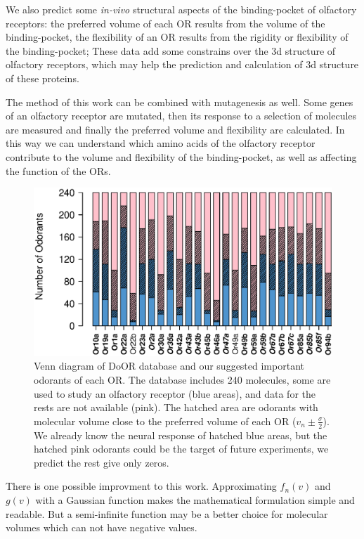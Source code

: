 \documentclass[11pt]{paper} %
\begin{document}
We also predict some {\it in-vivo} structural aspects of  the binding-pocket of olfactory receptors:
the preferred volume of each OR results from the volume of the binding-pocket,
the flexibility of an OR results from the rigidity or flexibility of the binding-pocket; 
These data add some constrains over the 3d structure of olfactory receptors, 
which may help the prediction and calculation of 3d structure of these proteins. 

The method of this work can be combined with mutagenesis as well. 
Some genes of an olfactory receptor are mutated, 
then its response to a selection of molecules are measured and finally the preferred volume and flexibility are calculated.
In this way we can understand which amino acids of the olfactory receptor contribute to the volume and flexibility of the binding-pocket, 
as well as affecting the function of the ORs.


\begin{figure}
\centering
	\includegraphics[width=\textwidth]{odorant-suggest}
	\caption{Venn diagram of DoOR database and our suggested important odorants of each OR.
			The database includes 240 molecules, 
			some are used to study an olfactory receptor (blue areas), 
			and data for the rests are not available (pink).
			The hatched area are odorants with molecular volume close to the preferred volume of each OR
			($v_n \pm \frac{\sigma}{2}$).
			We already know the neural response of hatched blue areas, 
			but the hatched pink odorants could be the target of future experiments, we predict the rest give only zeros.
			}
	\label{fig:odorant-suggest}
\end{figure}


There is one possible improvment to this work. Approximating $f_n(v)$ and $g(v)$ with a Gaussian function makes the mathematical formulation simple and readable. 
But a semi-infinite function may be a better choice for molecular volumes which can not have negative values.
\end{document}
